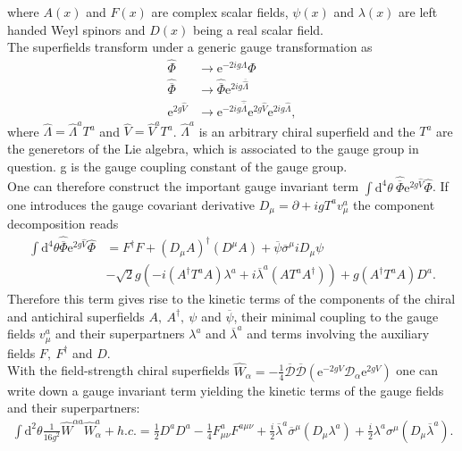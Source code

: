 where $A(x)$ and $F(x)$ are complex scalar fields, $\psi(x)$ and $\lambda(x)$ are left handed Weyl spinors and $D(x)$ being a real scalar field.\\
The superfields transform under a generic gauge transformation as
\begin{align}
\hat{\Phi} &\to \mathrm{e}^{-2ig\Lambda}\Phi\nonumber\\
\hat{\overline{\Phi}} &\to \hat{\overline{\Phi}}\mathrm{e}^{2ig\overline{\hat{\Lambda}}}\nonumber\\
\mathrm{e}^{2g\hat{V}} &\to \mathrm{e}^{-2ig\hat{\overline{\Lambda}}}\mathrm{e}^{2g\hat{V}} \mathrm{e}^{2ig\hat{\Lambda}},
\end{align}
where $\hat{\Lambda} = \hat{\Lambda}^aT^a$ and $\hat{V} = \hat{V}^aT^a$. $\hat{\Lambda}^a$ is an arbitrary chiral superfield and the $T^a$ are the generetors of the Lie algebra, which is associated to the gauge group in question. g is the gauge coupling constant of the gauge group.\\
One can therefore construct the important gauge invariant term $\int\mathrm{d}^4\theta\ \hat{\overline{\Phi}}\mathrm{e}^{2g\hat{V}}\hat{\Phi}$. If one introduces the gauge covariant derivative $D_\mu = \partial + ig T^a v^a_\mu$ the component decomposition reads
\begin{align}
\int\mathrm{d}^4\theta\hat{\overline{\Phi}}\mathrm{e}^{2g\hat{V}}\hat{\Phi} &= F^\dagger F + \left(D_\mu A\right)^\dagger \left(D^\mu A\right) + \overline{\psi}\overline{\sigma}^\mu i D_\mu \psi\nonumber \\
&- \sqrt{2}g\left( -i(A^\dagger T^aA)\lambda^a +i\overline{\lambda}^a(AT^aA^\dagger) \right) + g(A^\dagger T^a A) D^a .\label{eq:L_matter}
\end{align}
Therefore this term gives rise to the kinetic terms of the components of the chiral and antichiral superfields $A,\ A^\dagger,\ \psi$ and $\overline{\psi}$, their minimal coupling to the gauge fields $v_\mu^a$ and their superpartners $\lambda^a$ and $\overline{\lambda}^a$ and terms involving the auxiliary fields $F,\ F^\dagger$ and $D$.\\
With the field-strength chiral superfields $\hat{W}_\alpha = -\frac{1}{4}\overline{\mathcal{D}}\overline{\mathcal{D}}(\mathrm{e}^{-2gV}\mathcal{D}_\alpha\mathrm{e}^{2gV})$ one can write down a gauge invariant term yielding the kinetic terms of the gauge fields and their superpartners:
\begin{align}
\int\mathrm{d}^2\theta \frac{1}{16g^2 }\hat{W}^{\alpha a} \hat{W}^a_\alpha + h.c.= \frac{1}{2}D^aD^a -\frac{1}{4}F^a_{\mu\nu}F^{a\mu\nu} + \frac{i}{2}\overline{\lambda}^a\overline{\sigma}^\mu(D_\mu\lambda^a) + \frac{i}{2}\lambda^a\sigma^\mu(D_\mu\overline{\lambda}^a).\label{eq:L_gauge}
\end{align}
